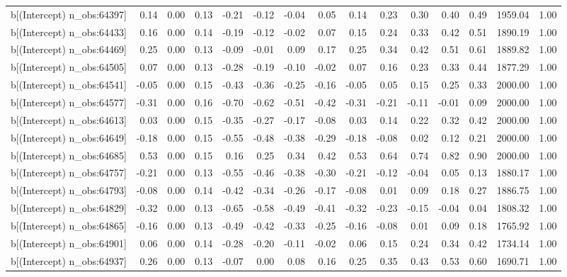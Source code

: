 \begin{table}[ht]
\begin{tabular}{rrrrrrrrrrrrrrr}
  b[(Intercept) n\_obs:64397] & 0.14 & 0.00 & 0.13 & -0.21 & -0.12 & -0.04 & 0.05 & 0.14 & 0.23 & 0.30 & 0.40 & 0.49 & 1959.04 & 1.00 \\ 
  b[(Intercept) n\_obs:64433] & 0.16 & 0.00 & 0.14 & -0.19 & -0.12 & -0.02 & 0.07 & 0.15 & 0.24 & 0.33 & 0.42 & 0.51 & 1890.19 & 1.00 \\ 
  b[(Intercept) n\_obs:64469] & 0.25 & 0.00 & 0.13 & -0.09 & -0.01 & 0.09 & 0.17 & 0.25 & 0.34 & 0.42 & 0.51 & 0.61 & 1889.82 & 1.00 \\ 
  b[(Intercept) n\_obs:64505] & 0.07 & 0.00 & 0.13 & -0.28 & -0.19 & -0.10 & -0.02 & 0.07 & 0.16 & 0.23 & 0.33 & 0.44 & 1877.29 & 1.00 \\ 
  b[(Intercept) n\_obs:64541] & -0.05 & 0.00 & 0.15 & -0.43 & -0.36 & -0.25 & -0.16 & -0.05 & 0.05 & 0.15 & 0.25 & 0.33 & 2000.00 & 1.00 \\ 
  b[(Intercept) n\_obs:64577] & -0.31 & 0.00 & 0.16 & -0.70 & -0.62 & -0.51 & -0.42 & -0.31 & -0.21 & -0.11 & -0.01 & 0.09 & 2000.00 & 1.00 \\ 
  b[(Intercept) n\_obs:64613] & 0.03 & 0.00 & 0.15 & -0.35 & -0.27 & -0.17 & -0.08 & 0.03 & 0.14 & 0.22 & 0.32 & 0.42 & 2000.00 & 1.00 \\ 
  b[(Intercept) n\_obs:64649] & -0.18 & 0.00 & 0.15 & -0.55 & -0.48 & -0.38 & -0.29 & -0.18 & -0.08 & 0.02 & 0.12 & 0.21 & 2000.00 & 1.00 \\ 
  b[(Intercept) n\_obs:64685] & 0.53 & 0.00 & 0.15 & 0.16 & 0.25 & 0.34 & 0.42 & 0.53 & 0.64 & 0.74 & 0.82 & 0.90 & 2000.00 & 1.00 \\ 
  b[(Intercept) n\_obs:64757] & -0.21 & 0.00 & 0.13 & -0.55 & -0.46 & -0.38 & -0.30 & -0.21 & -0.12 & -0.04 & 0.05 & 0.13 & 1880.17 & 1.00 \\ 
  b[(Intercept) n\_obs:64793] & -0.08 & 0.00 & 0.14 & -0.42 & -0.34 & -0.26 & -0.17 & -0.08 & 0.01 & 0.09 & 0.18 & 0.27 & 1886.75 & 1.00 \\ 
  b[(Intercept) n\_obs:64829] & -0.32 & 0.00 & 0.13 & -0.65 & -0.58 & -0.49 & -0.41 & -0.32 & -0.23 & -0.15 & -0.04 & 0.04 & 1808.32 & 1.00 \\ 
  b[(Intercept) n\_obs:64865] & -0.16 & 0.00 & 0.13 & -0.49 & -0.42 & -0.33 & -0.25 & -0.16 & -0.08 & 0.01 & 0.09 & 0.18 & 1765.92 & 1.00 \\ 
  b[(Intercept) n\_obs:64901] & 0.06 & 0.00 & 0.14 & -0.28 & -0.20 & -0.11 & -0.02 & 0.06 & 0.15 & 0.24 & 0.34 & 0.42 & 1734.14 & 1.00 \\ 
  b[(Intercept) n\_obs:64937] & 0.26 & 0.00 & 0.13 & -0.07 & 0.00 & 0.08 & 0.16 & 0.25 & 0.35 & 0.43 & 0.53 & 0.60 & 1690.71 & 1.00 \\ 

\end{tabular}
\end{table}
